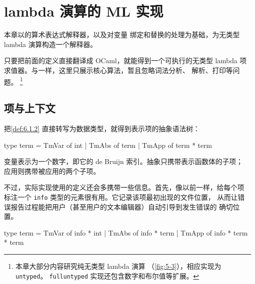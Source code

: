 
\chapter{lambda 演算的 ML 实现}
\label{chap:7}

本章以的算术表达式解释器，以及对变量
绑定和替换的处理为基础，为无类型 lambda 演算构造一个解释器。

只要把前面的定义直接翻译成 OCaml，就能得到一个可执行的无类型 lambda 项
求值器。与一样，这里只展示核心算法，暂且忽略词法分析、
解析、打印等问题。
\footnote{本章大部分内容研究纯无类型 lambda 演算
（\cref{fig:5-3}），相应实现为 \texttt{untyped}。
\texttt{fulluntyped} 实现还包含数字和布尔值等扩展。}


\section{项与上下文}
\label{sec:7.1}

把\cref{def:6.1.2} 直接转写为数据类型，就得到表示项的抽象语法树：

\begin{taplocamlcode}
type term =
    TmVar of int
  | TmAbs of term
  | TmApp of term * term
\end{taplocamlcode}

变量表示为一个数字，即它的 de Bruijn 索引。抽象只携带表示函数体的子项；
应用则携带被应用的两个子项。

不过，实际实现使用的定义还会多携带一些信息。首先，像以前一样，给每个项
标注一个 \texttt{info} 类型的元素很有用。它记录该项最初出现的文件位置，
从而让错误报告过程能把用户（甚至用户的文本编辑器）自动引导到发生错误的
确切位置。

\begin{taplocamlcode}
type term =
    TmVar of info * int
  | TmAbs of info * term
  | TmApp of info * term * term
\end{taplocamlcode}

